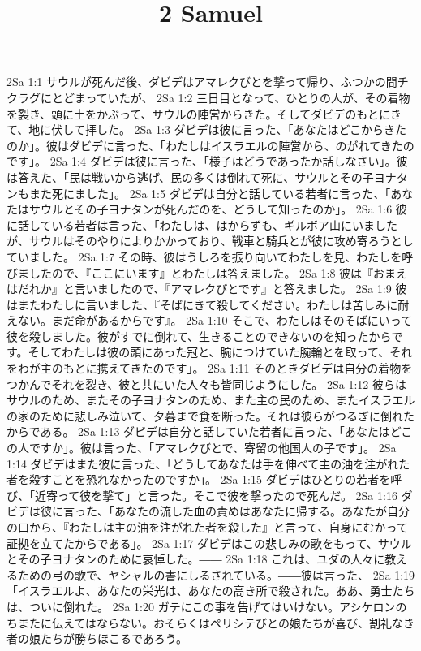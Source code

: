 

\title{2 Samuel}

2Sa 1:1  サウルが死んだ後、ダビデはアマレクびとを撃って帰り、ふつかの間チクラグにとどまっていたが、
2Sa 1:2  三日目となって、ひとりの人が、その着物を裂き、頭に土をかぶって、サウルの陣営からきた。そしてダビデのもとにきて、地に伏して拝した。
2Sa 1:3  ダビデは彼に言った、「あなたはどこからきたのか」。彼はダビデに言った、「わたしはイスラエルの陣営から、のがれてきたのです」。
2Sa 1:4  ダビデは彼に言った、「様子はどうであったか話しなさい」。彼は答えた、「民は戦いから逃げ、民の多くは倒れて死に、サウルとその子ヨナタンもまた死にました」。
2Sa 1:5  ダビデは自分と話している若者に言った、「あなたはサウルとその子ヨナタンが死んだのを、どうして知ったのか」。
2Sa 1:6  彼に話している若者は言った、「わたしは、はからずも、ギルボア山にいましたが、サウルはそのやりによりかかっており、戦車と騎兵とが彼に攻め寄ろうとしていました。
2Sa 1:7  その時、彼はうしろを振り向いてわたしを見、わたしを呼びましたので、『ここにいます』とわたしは答えました。
2Sa 1:8  彼は『おまえはだれか』と言いましたので、『アマレクびとです』と答えました。
2Sa 1:9  彼はまたわたしに言いました、『そばにきて殺してください。わたしは苦しみに耐えない。まだ命があるからです』。
2Sa 1:10  そこで、わたしはそのそばにいって彼を殺しました。彼がすでに倒れて、生きることのできないのを知ったからです。そしてわたしは彼の頭にあった冠と、腕につけていた腕輪とを取って、それをわが主のもとに携えてきたのです」。
2Sa 1:11  そのときダビデは自分の着物をつかんでそれを裂き、彼と共にいた人々も皆同じようにした。
2Sa 1:12  彼らはサウルのため、またその子ヨナタンのため、また主の民のため、またイスラエルの家のために悲しみ泣いて、夕暮まで食を断った。それは彼らがつるぎに倒れたからである。
2Sa 1:13  ダビデは自分と話していた若者に言った、「あなたはどこの人ですか」。彼は言った、「アマレクびとで、寄留の他国人の子です」。
2Sa 1:14  ダビデはまた彼に言った、「どうしてあなたは手を伸べて主の油を注がれた者を殺すことを恐れなかったのですか」。
2Sa 1:15  ダビデはひとりの若者を呼び、「近寄って彼を撃て」と言った。そこで彼を撃ったので死んだ。
2Sa 1:16  ダビデは彼に言った、「あなたの流した血の責めはあなたに帰する。あなたが自分の口から、『わたしは主の油を注がれた者を殺した』と言って、自身にむかって証拠を立てたからである」。
2Sa 1:17  ダビデはこの悲しみの歌をもって、サウルとその子ヨナタンのために哀悼した。――
2Sa 1:18  これは、ユダの人々に教えるための弓の歌で、ヤシャルの書にしるされている。――彼は言った、
2Sa 1:19  「イスラエルよ、あなたの栄光は、あなたの高き所で殺された。ああ、勇士たちは、ついに倒れた。
2Sa 1:20  ガテにこの事を告げてはいけない。アシケロンのちまたに伝えてはならない。おそらくはペリシテびとの娘たちが喜び、割礼なき者の娘たちが勝ちほこるであろう。
